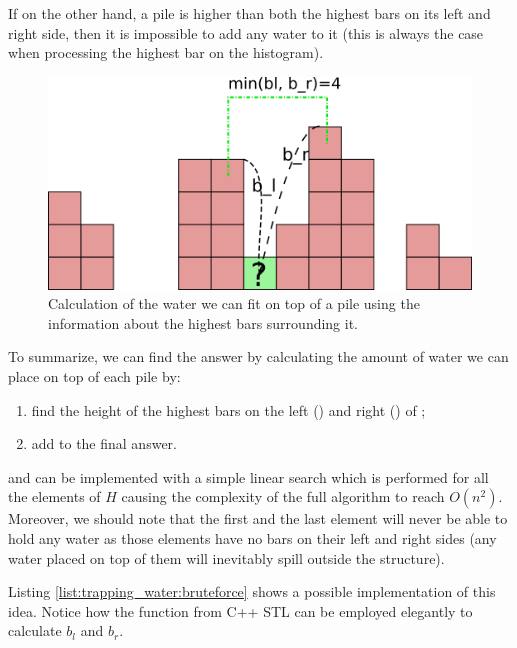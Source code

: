 If on the other hand, a pile is higher than both the highest bars on its left and right side, then it is impossible to add any water to it (this is always the case when processing the highest bar on the histogram).


\begin{figure}
	\centering
	\includegraphics[scale=1.0]{sources/trapping_water/images/example3}
	\caption{Calculation of the water we can fit on top of a pile using the information about the highest bars surrounding it.}
	\label{fig:trapping_water_example3}
\end{figure}

To summarize, we can find the answer by calculating the amount of water we can place on top of each pile  by:
\begin{enumerate}
	\item find the height of the highest bars on the left () and right () of ;
	\item add  to the final answer. 
\end{enumerate}
 and   can be implemented with a simple linear search which is performed for all the elements of $H$ causing the complexity of the full algorithm to reach $O(n^2)$.
Moreover, we should note that the first and the last element will never be able to hold any water as those elements have no bars on their left and right sides (any water placed on top of them will inevitably spill outside the structure).

Listing \ref{list:trapping_water:bruteforce} shows a possible implementation of this idea. 
Notice how the  function from C++ STL can be employed elegantly to calculate $b_l$ and $b_r$.




